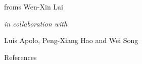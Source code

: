 \documentclass[
	10pt
	,handout
	,noamsthm
]{beamer}
\begin{document}
\begin{frame}

\centering

\huge
{}
\bigskip

\large
froms Wen-Xin Lai\ 

\textit{\normalsize in collaboration with}

	Luis Apolo,
	Peng-Xiang Hao 
	and Wei Song \\[2ex]

\end{frame}




\begin{frame}[allowframebreaks]{References}
\renewcommand*{\bibfont}{\footnotesize}
\printbibliography %
\end{frame}
\end{document}
